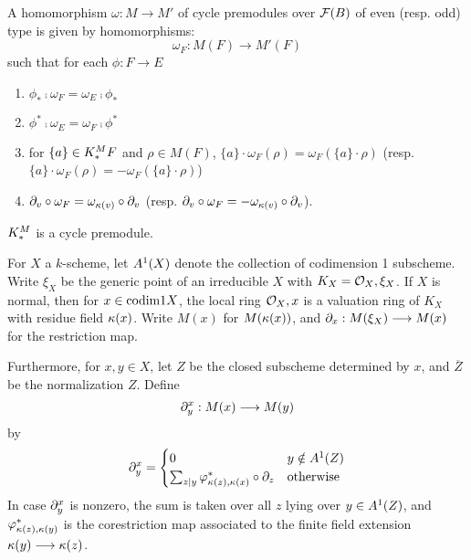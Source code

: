 \begin{definition}
A homomorphism $\omega: M \to M'$ of cycle premodules over 
$\fields(B)$ of even (resp. odd) type is given by homomorphisms:
\[
\omega_F: M(F) \to M'(F)
\]
such that for each $\phi: F \to E$
\begin{enumerate}
\item $\phi_* \comp \omega_F = \omega_E \comp \phi_*$

\item $\phi^* \comp \omega_E = \omega_F \comp \phi^*$

\item for $\{a\} \in \milK_*F$ and $\rho \in M(F)$, $\{a\} \cdot 
\omega_F(\rho) = \omega_F(\{a\} \cdot \rho)$ (resp. 
$\{a\} \cdot \omega_F(\rho) = -\omega_F(\{a\} \cdot \rho)$)

\item $\res{v} \comp \omega_F = \omega_{\resf{v}} \comp \res{v}$
(resp. $\res{v} \comp \omega_F = -\omega_{\resf{v}} \comp 
\res{v}$).
\end{enumerate}
\end{definition}

\begin{ex}
$\milK_*$ is a cycle premodule.
\end{ex}

For $X$ a $k$-scheme, let $\subsch{1}{X}$ denote the collection of 
codimension 1 subscheme. Write $\xi_X$ be the generic point of an
irreducible $X$ with $K_X = \O_X,\xi_X$. If $X$ is normal, then 
for $x \in \codim{1}{X}$, the local ring $\O_X,x$ is a valuation 
ring of $K_X$ with residue field $\resf{x}$. Write $M(x)$ for 
$M(\resf{x})$, and $\res{x}: M(\xi_X) \to M(x)$ for the 
restriction map.

Furthermore, for $x, y \in X$, let $Z$ be the closed subscheme 
determined by $x$, and $\overline{Z}$ be the normalization $Z$.
Define
\[
\ptres{x}{y}: M(x) \to M(y)
\]
by
\[
\ptres{x}{y} = 
\begin{cases}
0 & y \notin \subsch{1}{Z} \\
\sum_{z|y} \phi_{\resf{z},\resf{x}}^* \comp \res{z} & \textrm{otherwise}
\end{cases}
\]
In case $\ptres{x}{y}$ is nonzero, the sum is taken over all $z$
lying over $y \in \subsch{1}{Z}$, and
$\phi_{\resf{z},\resf{y}}^*$ is the corestriction map associated to 
the finite field extension $\resf{y} \to \resf{z}$.

